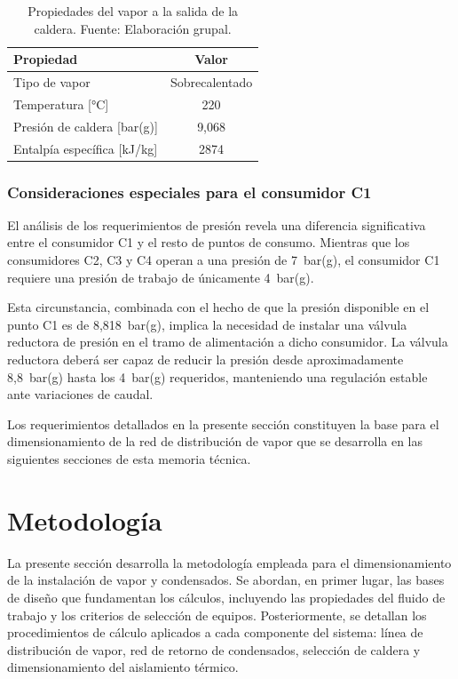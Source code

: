 \documentclass[12pt]{article}
\begin{document}
\begin{table}[H]
	\centering
	\caption{Propiedades del vapor a la salida de la caldera. Fuente: Elaboración grupal.}
	\label{tab:condiciones-vapor}
	\begin{tabular}{lc}
		\toprule
		\textbf{Propiedad}          & \textbf{Valor} \\
		\midrule
		Tipo de vapor               & Sobrecalentado \\
		Temperatura [°C]            & 220            \\
		Presión de caldera [bar(g)] & 9,068          \\
		Entalpía específica [kJ/kg] & 2874           \\
		\bottomrule
	\end{tabular}
\end{table}

\subsubsection{Consideraciones especiales para el consumidor C1}

El análisis de los requerimientos de presión revela una diferencia significativa entre el consumidor C1 y el resto de puntos de consumo. Mientras que los consumidores C2, C3 y C4 operan a una presión de 7~bar(g), el consumidor C1 requiere una presión de trabajo de únicamente 4~bar(g).

Esta circunstancia, combinada con el hecho de que la presión disponible en el punto C1 es de 8,818~bar(g), implica la necesidad de instalar una válvula reductora de presión en el tramo de alimentación a dicho consumidor. La válvula reductora deberá ser capaz de reducir la presión desde aproximadamente 8,8~bar(g) hasta los 4~bar(g) requeridos, manteniendo una regulación estable ante variaciones de caudal.

Los requerimientos detallados en la presente sección constituyen la base para el dimensionamiento de la red de distribución de vapor que se desarrolla en las siguientes secciones de esta memoria técnica.

\section{Metodología}
\label{sec:metodologia}

La presente sección desarrolla la metodología empleada para el dimensionamiento de la instalación de vapor y condensados. Se abordan, en primer lugar, las bases de diseño que fundamentan los cálculos, incluyendo las propiedades del fluido de trabajo y los criterios de selección de equipos. Posteriormente, se detallan los procedimientos de cálculo aplicados a cada componente del sistema: línea de distribución de vapor, red de retorno de condensados, selección de caldera y dimensionamiento del aislamiento térmico.
\end{document}
